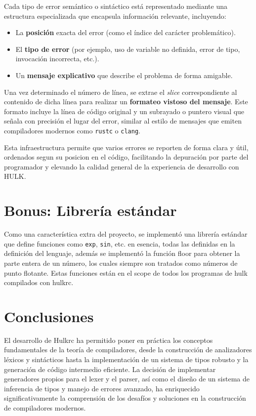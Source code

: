 \documentclass{article}
\begin{document}
Cada tipo de error semántico o sintáctico está representado mediante una estructura especializada que encapsula información relevante, incluyendo:

\begin{itemize}
    \item La \textbf{posición} exacta del error (como el índice del carácter problemático).
    \item El \textbf{tipo de error} (por ejemplo, uso de variable no definida, error de tipo, invocación incorrecta, etc.).
    \item Un \textbf{mensaje explicativo} que describe el problema de forma amigable.
\end{itemize}

Una vez determinado el número de línea, se extrae el \textit{slice} correspondiente al contenido de dicha línea para realizar un \textbf{formateo vistoso del mensaje}. Este formato incluye la línea de código original y un subrayado o puntero visual que señala con precisión el lugar del error, similar al estilo de mensajes que emiten compiladores modernos como \texttt{rustc} o \texttt{clang}.

Esta infraestructura permite que varios errores se reporten de forma clara y útil, ordenados segun su posicion en el código, facilitando la depuración por parte del programador y elevando la calidad general de la experiencia de desarrollo con HULK.

\section{Bonus: Librería estándar}

Como una característica extra del proyecto, se implementó una librería estándar que define funciones como \texttt{exp}, \texttt{sin}, etc. en esencia, todas las definidas en la definición del lenguaje, además se implementó la función floor para obtener la parte entera de un número, los cuales siempre son tratados como números de punto flotante. Estas funciones están en el scope de todos los programas de hulk compilados con hulkrc.

\section{Conclusiones}

El desarrollo de Hulkrc ha permitido poner en práctica los conceptos fundamentales de la teoría de compiladores, desde la construcción de analizadores léxicos y sintácticos hasta la implementación de un sistema de tipos robusto y la generación de código intermedio eficiente. La decisión de implementar generadores propios para el lexer y el parser, así como el diseño de un sistema de inferencia de tipos y manejo de errores avanzado, ha enriquecido significativamente la comprensión de los desafíos y soluciones en la construcción de compiladores modernos.
\end{document}

